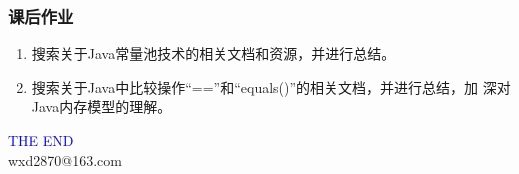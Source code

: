 \documentclass[hyperref={pdfpagelabels=false},compress,table]{beamer} %
\begin{document}
\begin{frame}[fragile] %
\frametitle{课后作业}
\begin{enumerate}
\item 搜索关于Java常量池技术的相关文档和资源，并进行总结。
\item 搜索关于Java中比较操作“==”和“equals()”的相关文档，并进行总结，加
  深对Java内存模型的理解。
\end{enumerate}
\end{frame}

\begin{frame}
\centering
{\Huge \textcolor{blue}{THE END}} \\
\vspace{5mm}
{\Large wxd2870@163.com} \\
\end{frame}
\end{document}

